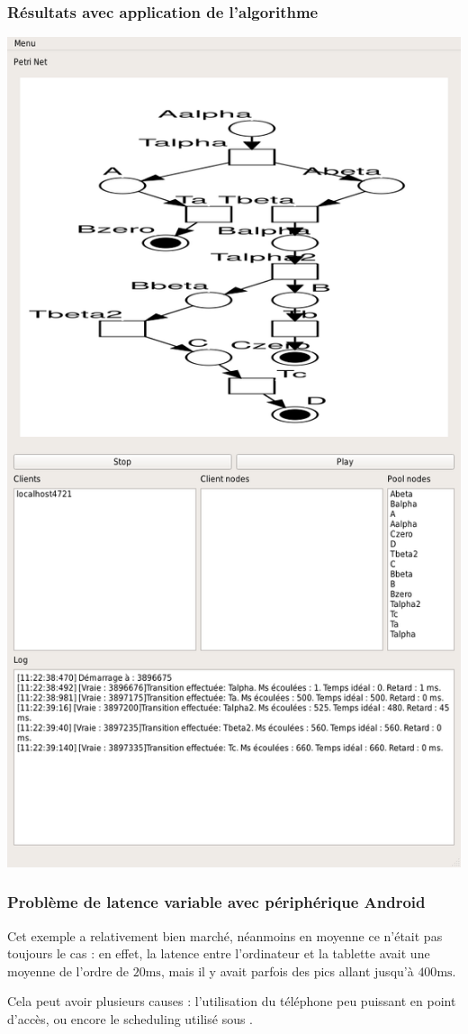 \subsubsection{Résultats avec application de l'algorithme}
\includegraphics[scale=0.3]{images/resultats/test1mieux.png}

\subsubsection{Problème de latence variable avec périphérique Android}
Cet exemple a relativement bien marché, néanmoins en moyenne ce n'était pas toujours le cas : en effet, la latence entre l'ordinateur et la tablette  avait une moyenne de l'ordre de $\num{20} \si{\milli\second}$, mais il y avait parfois des pics allant jusqu'à $\num{400} \si{\milli\second}$.

Cela peut avoir plusieurs causes : l'utilisation du téléphone peu puissant en point d'accès, ou encore le scheduling utilisé sous .
